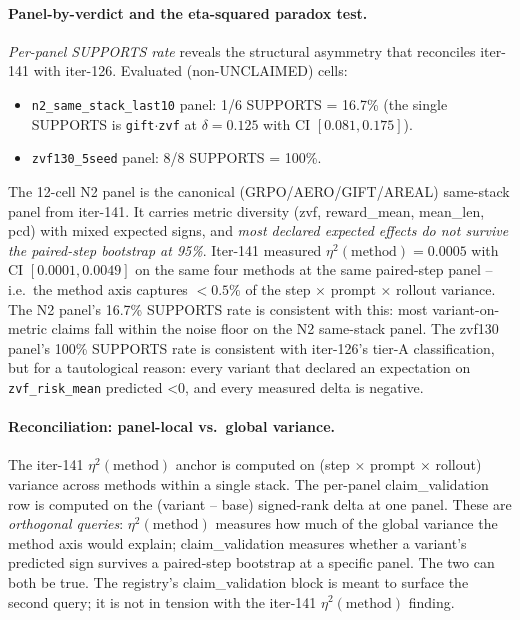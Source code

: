 \paragraph{Panel-by-verdict and the eta-squared paradox test.}
\textit{Per-panel SUPPORTS rate} reveals the structural asymmetry that
reconciles iter-141 with iter-126.  Evaluated (non-UNCLAIMED) cells:
\begin{itemize}
\item \texttt{n2\_same\_stack\_last10} panel: 1/6 SUPPORTS = 16.7\%
(the single SUPPORTS is \texttt{gift}$\cdot$\texttt{zvf} at $\delta=0.125$
with CI $[0.081, 0.175]$).
\item \texttt{zvf130\_5seed} panel: 8/8 SUPPORTS = 100\%.
\end{itemize}
The 12-cell N2 panel is the canonical (GRPO/AERO/GIFT/AREAL) same-stack
panel from iter-141.  It carries metric diversity
(zvf, reward\_mean, mean\_len, pcd) with mixed expected signs, and
\emph{most declared expected effects do not survive the paired-step
bootstrap at 95\%}.  Iter-141 measured $\eta^2(\text{method}) = 0.0005$
with CI $[0.0001, 0.0049]$ on the same four methods at the same
paired-step panel -- i.e.\ the method axis captures $< 0.5\%$ of the
step $\times$ prompt $\times$ rollout variance.  The N2 panel's 16.7\%
SUPPORTS rate is consistent with this: most variant-on-metric claims
fall within the noise floor on the N2 same-stack panel.  The zvf130
panel's 100\% SUPPORTS rate is consistent with iter-126's tier-A
classification, but for a tautological reason: every variant that
declared an expectation on \texttt{zvf\_risk\_mean} predicted
\textless 0, and every measured delta is negative.

\paragraph{Reconciliation: panel-local vs.\ global variance.}
The iter-141 $\eta^2(\text{method})$ anchor is computed on
(step $\times$ prompt $\times$ rollout) variance across methods within a
single stack.  The per-panel claim\_validation row is computed on the
(variant -- base) signed-rank delta at one panel.  These are
\emph{orthogonal queries}: $\eta^2(\text{method})$ measures how much of
the global variance the method axis would explain; claim\_validation
measures whether a variant's predicted sign survives a paired-step
bootstrap at a specific panel.  The two can both be true.  The registry's
claim\_validation block is meant to surface the second query; it is not
in tension with the iter-141 $\eta^2(\text{method})$ finding.

